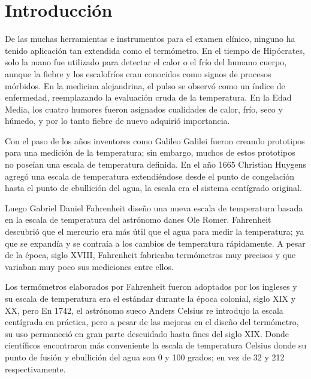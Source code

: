 \section{Introducción}

\par
De las muchas herramientas e instrumentos para el examen clínico, ninguno ha tenido aplicación tan extendida como el termómetro. En el tiempo de Hipócrates, solo la mano fue utilizado para detectar el calor o el frío del humano cuerpo, aunque la fiebre y los escalofríos eran conocidos como signos de procesos mórbidos. En la medicina alejandrina, el pulso se observó como un índice de enfermedad, reemplazando la evaluación cruda de la temperatura. En la Edad Media, los cuatro humores fueron asignados cualidades de calor, frío, seco y húmedo, y por lo tanto fiebre de nuevo adquirió importancia.\cite{intro-historia}

\par \noindent
Con el paso de los años inventores como Galileo Galilei fueron creando prototipos para una medición de la temperatura; sin embargo, muchos de estos prototipos no poseían una escala de temperatura definida. En el año 1665 Christian Huygens agregó una escala de temperatura extendiéndose desde el punto de congelación hasta el punto de ebullición del agua, la escala era el sistema centígrado original.\cite{intro-historia}

\par \noindent
Luego Gabriel Daniel Fahrenheit diseño una nueva escala de temperatura basada en la escala de temperatura del astrónomo danes Ole Romer. Fahrenheit descubrió que el mercurio era más útil que el agua para medir la temperatura; ya que se expandía y se contraía a los cambios de temperatura rápidamente. A pesar de la época, siglo XVIII, Fahrenheit fabricaba termómetros muy precisos y que variaban muy poco sus mediciones entre ellos.\cite{intro-historia}

\par \noindent
Los termómetros elaborados por Fahrenheit fueron adoptados por los ingleses y su escala de temperatura era el estándar durante la época colonial, siglo XIX y XX, pero En 1742, el astrónomo sueco Anders Celsius re introdujo la escala centígrada en práctica, pero a pesar de las mejoras en el diseño del termómetro, su uso permaneció en gran parte descuidado hasta fines del siglo XIX. Donde científicos encontraron más conveniente la escala de temperatura Celsius donde su punto de fusión y ebullición del agua son 0 y 100 grados; en vez de 32 y 212 respectivamente.\cite{intro-historia}

